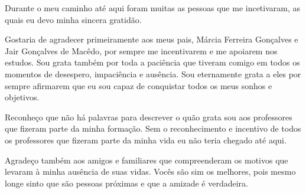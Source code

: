 \begin{agradecimentos}
Durante o meu caminho até aqui foram muitas as pessoas que me incetivaram, as quais eu devo minha sincera gratidão. 

Gostaria de agradecer primeiramente aos meus pais, Márcia Ferreira Gonçalves e Jair Gonçalves de Macêdo, por sempre me incentivarem e me apoiarem nos estudos. Sou grata também por toda a paciência que tiveram comigo em todos os momentos de desespero, impaciência e ausência. Sou eternamente grata a eles por sempre afirmarem que eu sou capaz de conquistar todos os meus sonhos e objetivos.

Reconheço que não há palavras para descrever o quão grata sou aos professores que fizeram parte da minha formação. Sem o reconhecimento e incentivo de todos os professores que fizeram parte da minha vida eu não teria chegado até aqui.

Agradeço também aos amigos e familiares que compreenderam os motivos que levaram à minha ausência de suas vidas. Vocês são sim os melhores, pois mesmo longe sinto que são pessoas próximas e que a amizade é verdadeira. 

\end{agradecimentos}
